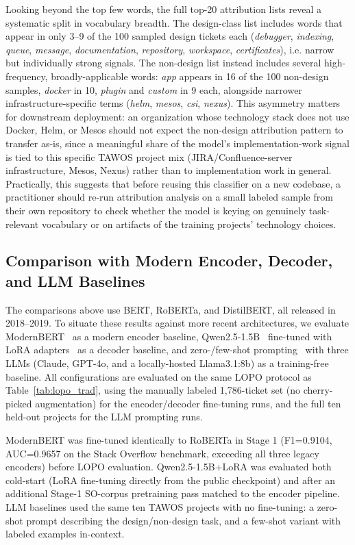 \documentclass[preprint,12pt]{elsarticle}
\begin{document}
Looking beyond the top few words, the full top-20 attribution lists reveal a systematic split in vocabulary breadth. The design-class list includes words that appear in only 3--9 of the 100 sampled design tickets each (\emph{debugger}, \emph{indexing}, \emph{queue}, \emph{message}, \emph{documentation}, \emph{repository}, \emph{workspace}, \emph{certificates}), i.e. narrow but individually strong signals. The non-design list instead includes several high-frequency, broadly-applicable words: \emph{app} appears in 16 of the 100 non-design samples, \emph{docker} in 10, \emph{plugin} and \emph{custom} in 9 each, alongside narrower infrastructure-specific terms (\emph{helm}, \emph{mesos}, \emph{csi}, \emph{nexus}). This asymmetry matters for downstream deployment: an organization whose technology stack does not use Docker, Helm, or Mesos should not expect the non-design attribution pattern to transfer as-is, since a meaningful share of the model's implementation-work signal is tied to this specific TAWOS project mix (JIRA/Confluence-server infrastructure, Mesos, Nexus) rather than to implementation work in general. Practically, this suggests that before reusing this classifier on a new codebase, a practitioner should re-run attribution analysis on a small labeled sample from their own repository to check whether the model is keying on genuinely task-relevant vocabulary or on artifacts of the training projects' technology choices.

\subsection{Comparison with Modern Encoder, Decoder, and LLM Baselines}
\label{sec:llm-baselines}

The comparisons above use BERT, RoBERTa, and DistilBERT, all released in 2018--2019. To situate these results against more recent architectures, we evaluate ModernBERT~\cite{warner2024modernbert} as a modern encoder baseline, Qwen2.5-1.5B~\cite{qwen2024technical} fine-tuned with LoRA adapters~\cite{hu2022lora} as a decoder baseline, and zero-/few-shot prompting~\cite{brown2020fewshot} with three LLMs (Claude, GPT-4o, and a locally-hosted Llama3.1:8b) as a training-free baseline. All configurations are evaluated on the same LOPO protocol as Table~\ref{tab:lopo_trad}, using the manually labeled 1,786-ticket set (no cherry-picked augmentation) for the encoder/decoder fine-tuning runs, and the full ten held-out projects for the LLM prompting runs.

ModernBERT was fine-tuned identically to RoBERTa in Stage 1 (F1=0.9104, AUC=0.9657 on the Stack Overflow benchmark, exceeding all three legacy encoders) before LOPO evaluation. Qwen2.5-1.5B+LoRA was evaluated both cold-start (LoRA fine-tuning directly from the public checkpoint) and after an additional Stage-1 SO-corpus pretraining pass matched to the encoder pipeline. LLM baselines used the same ten TAWOS projects with no fine-tuning: a zero-shot prompt describing the design/non-design task, and a few-shot variant with labeled examples in-context.
\end{document}
